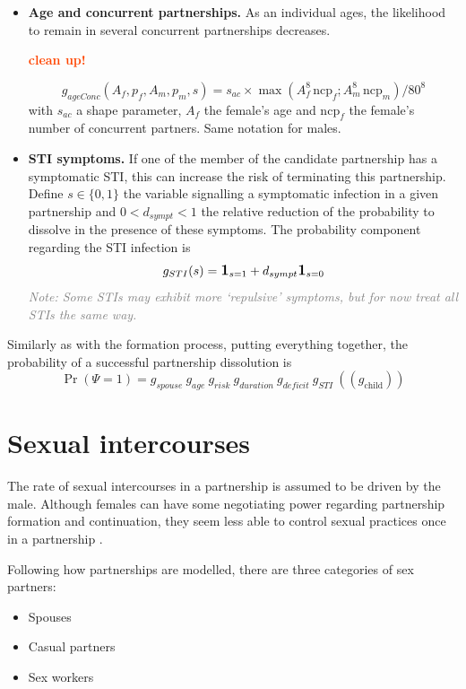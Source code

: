 \documentclass[11pt, onecolumn]{article}
\newcommand{\one}[1]{\textbf{\large{1}}_{#1}}
\newcommand{\warning}[1]{\textbf{\textcolor{OrangeRed}{#1}}}
\newcommand{\note}[1]{\textit{\textcolor{Grey}{Note: #1}}}
\begin{document}
\begin{itemize}
\item \textbf{Age and concurrent partnerships.} As an individual ages, the likelihood to remain in several concurrent partnerships decreases. 

\warning{clean up!}

$$g_{ageConc}(A_f,p_f,A_m,p_m,s) = s_{ac} \times \max\left( A_f^8 \, \mathrm{ncp}_f ; A_m^8 \, \mathrm{ncp}_m  \right)/80^8$$
with $s_{ac}$ a shape parameter, $A_f$ the female's age and $\mathrm{ncp}_f$ the female's number of concurrent partners. Same notation for males. 


\item \textbf{STI symptoms.}
If one of the member of the candidate partnership has a symptomatic STI, this can increase the risk of terminating this partnership.
Define $s\in\{0,1\}$ the variable signalling a symptomatic infection in a given partnership  and $0<d_{sympt}<1$ the relative reduction of the probability to dissolve in the presence of these symptoms.
The probability component regarding the STI infection is
$$ g_{STI}(s)= \one{s=1} +d_{sympt}\one{s=0}$$
\note{Some STIs may exhibit more `repulsive' symptoms, but for now treat all STIs the same way.}

\end{itemize}

Similarly as with the formation process, putting everything together, the probability of a successful partnership dissolution is
\begin{equation}
\label{probaDissolution}
\Pr(\Psi=1) = g_{spouse}\ g_{age}\ g_{risk}\ g_{duration}\ g_{deficit}\ g_{STI}\ ((g_{\mathrm{child}}))
\end{equation}




\section{Sexual intercourses}

The rate of sexual intercourses in a partnership is assumed to be driven by the male. Although females can have some negotiating power regarding partnership formation and continuation, they seem less able to control sexual practices once in a partnership \cite{Luke:2002vt}.  

Following how partnerships are modelled, there are three categories of sex partners:
\begin{itemize}
\item Spouses
\item Casual partners
\item Sex workers
\end{itemize}
\end{document}
